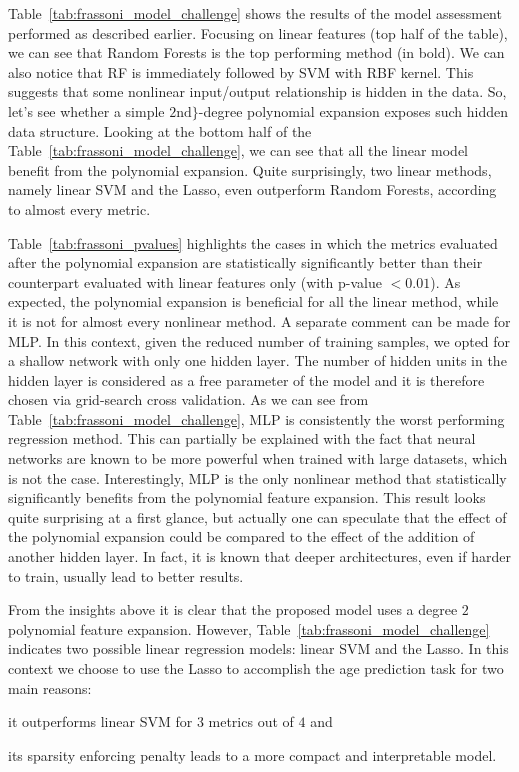 Table~\ref{tab:frassoni_model_challenge} shows the results of the model assessment performed as described earlier. Focusing on linear features (top half of the table), we can see that Random Forests is the top performing method (in bold). We can also notice that RF is immediately followed by SVM with RBF kernel. This suggests that some nonlinear input/output relationship is hidden in the data. So, let's see whether a simple $2\text{nd}\}$-degree polynomial expansion exposes such hidden data structure.
Looking at the bottom half of the Table~\ref{tab:frassoni_model_challenge}, we can see that all the linear model benefit from the polynomial expansion. Quite surprisingly, two linear methods, namely linear SVM and the Lasso, even outperform Random Forests, according to almost every metric.

Table~\ref{tab:frassoni_pvalues} highlights the cases in which the metrics evaluated after the polynomial expansion are statistically significantly better than their counterpart evaluated with linear features only (with p-value $< 0.01$).
As expected, the polynomial expansion is beneficial for all the linear method, while it is not for almost every nonlinear method.
A separate comment can be made for MLP. In this context, given the reduced number of training samples, we opted for a shallow network with only one hidden layer. The number of hidden units in the hidden layer is considered as a free parameter of the model and it is therefore chosen via grid-search cross validation.
As we can see from Table~\ref{tab:frassoni_model_challenge}, MLP is consistently the worst performing regression method. This can partially be explained with the fact that neural networks are known to be more powerful when trained with large datasets, which is not the case. Interestingly, MLP is the only nonlinear method that statistically significantly benefits from the polynomial feature expansion.
This result looks quite surprising at a first glance, but actually one can speculate that the effect of the polynomial expansion could be compared to the effect of the addition of another hidden layer. In fact, it is known that deeper architectures, even if harder to train, usually lead to better results.




From the insights above it is clear that the proposed model uses a degree $2$ polynomial feature expansion. However, Table~\ref{tab:frassoni_model_challenge} indicates two possible linear regression models: linear SVM and the Lasso. In this context we choose to use the Lasso to accomplish the age prediction task for two main reasons:
\begin{enumerate*}[label=(\roman*)]
	\item it outperforms linear SVM for $3$ metrics out of $4$ and
	\item its sparsity enforcing penalty leads to a more compact and interpretable model.
\end{enumerate*}

